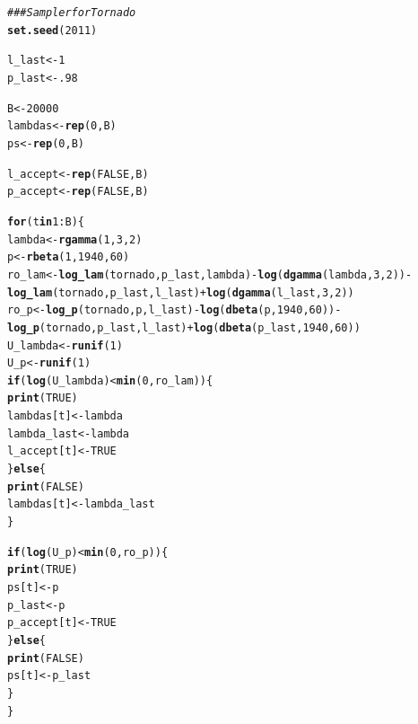 \documentclass{article}\usepackage[]{graphicx}\usepackage[]{color}
\makeatletter
\newcommand{\hlnum}[1]{\textcolor[rgb]{0.686,0.059,0.569}{#1}}%
\newcommand{\hlcom}[1]{\textcolor[rgb]{0.678,0.584,0.686}{\textit{#1}}}%
\newcommand{\hlopt}[1]{\textcolor[rgb]{0,0,0}{#1}}%
\newcommand{\hlstd}[1]{\textcolor[rgb]{0.345,0.345,0.345}{#1}}%
\newcommand{\hlkwa}[1]{\textcolor[rgb]{0.161,0.373,0.58}{\textbf{#1}}}%
\newcommand{\hlkwb}[1]{\textcolor[rgb]{0.69,0.353,0.396}{#1}}%
\newcommand{\hlkwd}[1]{\textcolor[rgb]{0.737,0.353,0.396}{\textbf{#1}}}%
\newenvironment{kframe}{%
 \def\at@end@of@kframe{}%
 \ifinner\ifhmode%
  \def\at@end@of@kframe{\end{minipage}}%
  \begin{minipage}{\columnwidth}%
 \fi\fi%
 \def\FrameCommand##1{\hskip\@totalleftmargin \hskip-\fboxsep
 \colorbox{shadecolor}{##1}\hskip-\fboxsep
     \hskip-\linewidth \hskip-\@totalleftmargin \hskip\columnwidth}%
 \MakeFramed {\advance\hsize-\width
   \@totalleftmargin\z@ \linewidth\hsize
   \@setminipage}}%
 {\par\unskip\endMakeFramed%
 \at@end@of@kframe}
\newenvironment{knitrout}{}{} %
\makeatother
\begin{document}
\begin{knitrout}
\begin{kframe}
\begin{alltt}
\hlcom{### Sampler for Tornado}
\hlkwd{set.seed}\hlstd{(}\hlnum{2011}\hlstd{)}

\hlstd{l_last} \hlkwb{<-} \hlnum{1}
\hlstd{p_last} \hlkwb{<-} \hlnum{.98}

\hlstd{B} \hlkwb{<-} \hlnum{20000}
\hlstd{lambdas} \hlkwb{<-} \hlkwd{rep}\hlstd{(}\hlnum{0}\hlstd{, B)}
\hlstd{ps} \hlkwb{<-} \hlkwd{rep}\hlstd{(}\hlnum{0}\hlstd{, B)}

\hlstd{l_accept} \hlkwb{<-} \hlkwd{rep}\hlstd{(}\hlnum{FALSE}\hlstd{, B)}
\hlstd{p_accept} \hlkwb{<-} \hlkwd{rep}\hlstd{(}\hlnum{FALSE}\hlstd{, B)}

\hlkwa{for}\hlstd{(t} \hlkwa{in} \hlnum{1}\hlopt{:}\hlstd{B)\{}
  \hlstd{lambda} \hlkwb{<-} \hlkwd{rgamma}\hlstd{(}\hlnum{1}\hlstd{,} \hlnum{3}\hlstd{,} \hlnum{2}\hlstd{)}
  \hlstd{p} \hlkwb{<-} \hlkwd{rbeta}\hlstd{(}\hlnum{1}\hlstd{,} \hlnum{1940}\hlstd{,} \hlnum{60}\hlstd{)}
  \hlstd{ro_lam} \hlkwb{<-} \hlkwd{log_lam}\hlstd{(tornado, p_last, lambda)} \hlopt{-} \hlkwd{log}\hlstd{(}\hlkwd{dgamma}\hlstd{(lambda,} \hlnum{3}\hlstd{,} \hlnum{2}\hlstd{))} \hlopt{-}
    \hlkwd{log_lam}\hlstd{(tornado, p_last, l_last)} \hlopt{+} \hlkwd{log}\hlstd{(}\hlkwd{dgamma}\hlstd{(l_last,} \hlnum{3}\hlstd{,} \hlnum{2}\hlstd{))}
  \hlstd{ro_p} \hlkwb{<-} \hlkwd{log_p}\hlstd{(tornado, p, l_last)} \hlopt{-} \hlkwd{log}\hlstd{(}\hlkwd{dbeta}\hlstd{(p,} \hlnum{1940}\hlstd{,} \hlnum{60}\hlstd{))} \hlopt{-}
    \hlkwd{log_p}\hlstd{(tornado, p_last, l_last)} \hlopt{+} \hlkwd{log}\hlstd{(}\hlkwd{dbeta}\hlstd{(p_last,} \hlnum{1940}\hlstd{,} \hlnum{60}\hlstd{))}
  \hlstd{U_lambda} \hlkwb{<-} \hlkwd{runif}\hlstd{(}\hlnum{1}\hlstd{)}
  \hlstd{U_p} \hlkwb{<-} \hlkwd{runif}\hlstd{(}\hlnum{1}\hlstd{)}
  \hlkwa{if}\hlstd{(}\hlkwd{log}\hlstd{(U_lambda)} \hlopt{<} \hlkwd{min}\hlstd{(}\hlnum{0}\hlstd{, ro_lam))\{}
    \hlkwd{print}\hlstd{(}\hlnum{TRUE}\hlstd{)}
    \hlstd{lambdas[t]} \hlkwb{<-} \hlstd{lambda}
    \hlstd{lambda_last} \hlkwb{<-} \hlstd{lambda}
    \hlstd{l_accept[t]} \hlkwb{<-} \hlnum{TRUE}
  \hlstd{\}} \hlkwa{else}\hlstd{\{}
    \hlkwd{print}\hlstd{(}\hlnum{FALSE}\hlstd{)}
    \hlstd{lambdas[t]} \hlkwb{<-} \hlstd{lambda_last}
  \hlstd{\}}

  \hlkwa{if}\hlstd{(}\hlkwd{log}\hlstd{(U_p)} \hlopt{<} \hlkwd{min}\hlstd{(}\hlnum{0}\hlstd{, ro_p))\{}
    \hlkwd{print}\hlstd{(}\hlnum{TRUE}\hlstd{)}
    \hlstd{ps[t]} \hlkwb{<-} \hlstd{p}
    \hlstd{p_last} \hlkwb{<-} \hlstd{p}
    \hlstd{p_accept[t]} \hlkwb{<-} \hlnum{TRUE}
  \hlstd{\}} \hlkwa{else}\hlstd{\{}
    \hlkwd{print}\hlstd{(}\hlnum{FALSE}\hlstd{)}
    \hlstd{ps[t]} \hlkwb{<-} \hlstd{p_last}
  \hlstd{\}}
\hlstd{\}}


\end{alltt}
\end{kframe}
\end{knitrout}
\end{document}
